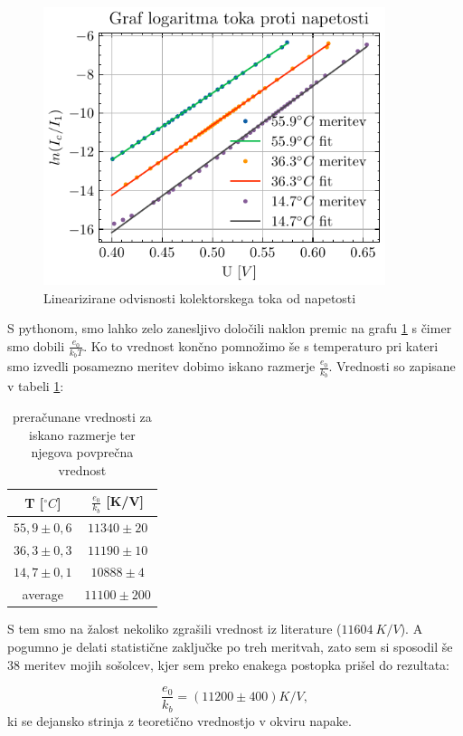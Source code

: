 \documentclass[12pt]{article}
\begin{document}
\begin{figure}[ht]
\begin{center}
    \includegraphics[width=10cm]{moju_lin.pdf}
    \caption{Linearizirane odvisnosti kolektorskega toka od napetosti}
    \label{linbin}
\end{center}
\end{figure}

\newpage
\noindent S pythonom, smo lahko zelo zanesljivo določili naklon premic na grafu \ref{linbin} s čimer smo dobili $\frac{e_0}{k_bT}$. Ko to vrednost končno pomnožimo še s temperaturo pri kateri smo izvedli posamezno meritev dobimo iskano razmerje $\frac{e_0}{k_b}$. Vrednosti so zapisane v tabeli \ref{tabela}:

\begin{table}[!ht]
\centering
\begin{tabular}{c|c}
    T [$^{\circ} C$] & $\frac{e_0}{k_b}$ [K/V] \\ \hline
    $55,9 \pm 0,6$ & $11340\pm 20$ \\
    $36,3\pm 0,3$ & $11190\pm 10$\\
    $14,7\pm 0,1$ & $10888\pm 4$\\\hline \hline
    average & $11100\pm 200$\\
\end{tabular}
\caption{preračunane vrednosti za iskano razmerje ter njegova povprečna vrednost}
\label{tabela}
\end{table}

S tem smo na žalost nekoliko zgrašili vrednost iz literature ($11604\ K/V$). A pogumno je delati statistične zaključke po treh meritvah, zato sem si sposodil še 38 meritev mojih sošolcev, kjer sem preko enakega postopka prišel do rezultata:

\begin{equation*}
    \frac{e_0}{k_b} = (11200\pm 400) K/V,
\end{equation*}
ki se dejansko strinja z teoretično vrednostjo v okviru napake.
\end{document}
